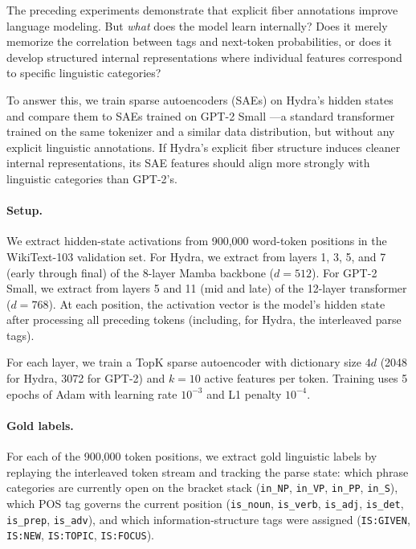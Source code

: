 \documentclass[11pt]{article}
\begin{document}
The preceding experiments demonstrate that explicit fiber annotations improve 
language modeling. But \emph{what} does the model learn internally? Does it 
merely memorize the correlation between tags and next-token probabilities, or 
does it develop structured internal representations where individual features 
correspond to specific linguistic categories?

To answer this, we train sparse autoencoders (SAEs) 
\cite{cunningham2023sparse, bricken2023monosemanticity} on Hydra's hidden 
states and compare them to SAEs trained on GPT-2 Small 
\cite{radford2019language}---a standard transformer trained on the same 
tokenizer and a similar data distribution, but without any explicit 
linguistic annotations. If Hydra's explicit fiber structure induces cleaner 
internal representations, its SAE features should align more strongly with 
linguistic categories than GPT-2's.

\paragraph{Setup.}
We extract hidden-state activations from 900,000 word-token positions in 
the WikiText-103 validation set. For Hydra, we extract from layers 1, 3, 5, 
and 7 (early through final) of the 8-layer Mamba backbone ($d=512$). For 
GPT-2 Small, we extract from layers 5 and 11 (mid and late) of the 12-layer 
transformer ($d=768$). At each position, the activation vector is the model's 
hidden state after processing all preceding tokens (including, for Hydra, the 
interleaved parse tags).

For each layer, we train a TopK sparse autoencoder \cite{makhzani2013topk} 
with dictionary size $4d$ (2048 for Hydra, 3072 for GPT-2) and $k=10$ 
active features per token. Training uses 5 epochs of Adam with learning 
rate $10^{-3}$ and L1 penalty $10^{-4}$.

\paragraph{Gold labels.}
For each of the 900,000 token positions, we extract gold linguistic labels 
by replaying the interleaved token stream and tracking the parse state: 
which phrase categories are currently open on the bracket stack 
(\texttt{in\_NP}, \texttt{in\_VP}, \texttt{in\_PP}, \texttt{in\_S}), which 
POS tag governs the current position (\texttt{is\_noun}, \texttt{is\_verb}, 
\texttt{is\_adj}, \texttt{is\_det}, \texttt{is\_prep}, \texttt{is\_adv}), 
and which information-structure tags were assigned (\texttt{IS:GIVEN}, 
\texttt{IS:NEW}, \texttt{IS:TOPIC}, \texttt{IS:FOCUS}).
\end{document}
